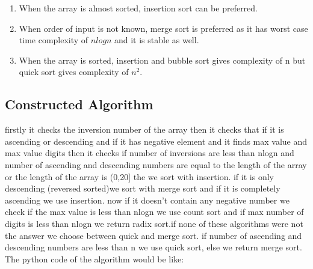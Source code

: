 \documentclass[
10pt, %
a4paper, %
oneside, %
headinclude,footinclude, %
BCOR5mm, %
]{scrartcl}
\begin{document}
\begin{enumerate}[noitemsep]
\item When the array is almost sorted, insertion sort can be preferred.
\item When order of input is not known, merge sort is preferred as it has worst case time complexity of $nlogn$ and it is stable as well.
\item When the array is sorted, insertion and bubble sort gives complexity of n but quick sort gives complexity of $n^2$.

\end{enumerate}






\subsection{Constructed Algorithm}
 firstly it checks the inversion number of the array then it checks that if it is ascending or descending and if it has negative element and it finds max value and max value digits then it checks if number of inversions are less  than nlogn and number of ascending and descending numbers are equal to the length of the array or the length of the array is (0,20] the we sort with insertion. 
 if it is only descending (reversed sorted)we sort with merge sort and if it is completely ascending we use insertion.
 now if it doesn't contain any negative number we check if the max value is less than nlogn we use count sort and if max number of digits is less than nlogn we return radix sort.if none of these algorithms were not the answer we choose between quick and merge sort. if number of ascending and descending numbers are less than n we use quick sort, else we return merge sort.
 \\
The python code of the algorithm would be like:
\end{document}
